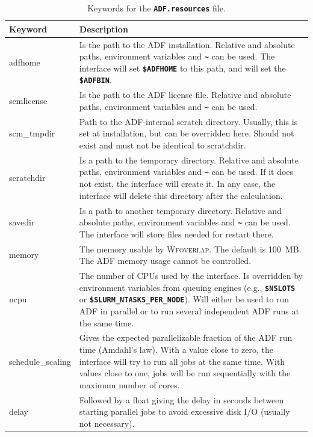 \documentclass[a4paper,10pt,DIV=15,openany,twoside=false]{scrbook}
\newcommand{\ttt}[1]{\textbf{\texttt{#1}}}
\begin{document}
\begin{table}
  \centering
  \caption{Keywords for the \ttt{ADF.resources} file.}
  \label{tab:adf_sh2}
  \begin{tabular}{>{\ttfamily}lp{12cm}}
  \toprule
  Keyword       &Description\\
  \midrule
adfhome                 &Is the path to the \textsc{ADF} installation. Relative and absolute paths, environment variables and \ttt{\textasciitilde} can be used. The interface will set \ttt{\$ADFHOME} to this path, and will set the \ttt{\$ADFBIN}.
\\
scmlicense              &Is the path to the \textsc{ADF} license file. Relative and absolute paths, environment variables and \ttt{\textasciitilde} can be used. 
\\
scm\_tmpdir             &Path to the ADF-internal scratch directory. Usually, this is set at installation, but can be overridden here. Should not exist and must not be identical to scratchdir.
\\
scratchdir              &Is a path to the temporary directory. Relative and absolute paths, environment variables and \ttt{\textasciitilde} can be used. If it does not exist, the interface will create it. In any case, the interface will delete this directory after the calculation.
\\
savedir                 &Is a path to another temporary directory.  Relative and absolute paths, environment variables and \ttt{\textasciitilde} can be used. The interface will store files needed for restart there.
\\
memory                  &The memory usable by \textsc{Wfoverlap}. The default is 100~MB. The ADF memory usage cannot be controlled.
\\
ncpu                    &The number of CPUs used by the interface. Is overridden by environment variables from queuing engines (e.g., \ttt{\$NSLOTS} or \ttt{\$SLURM\_NTASKS\_PER\_NODE}). Will either be used to run ADF in parallel or to run several independent ADF runs at the same time.
\\
schedule\_scaling       &Gives the expected parallelizable fraction of the ADF run time (Amdahl's law). With a value close to zero, the interface will try to run all jobs at the same time. With values close to one, jobs will be run sequentially with the maximum number of cores.
\\
delay                   &Followed by a float giving the delay in seconds between starting parallel jobs to avoid excessive disk I/O (usually not necessary).

\end{tabular}
\end{table}
\end{document}
